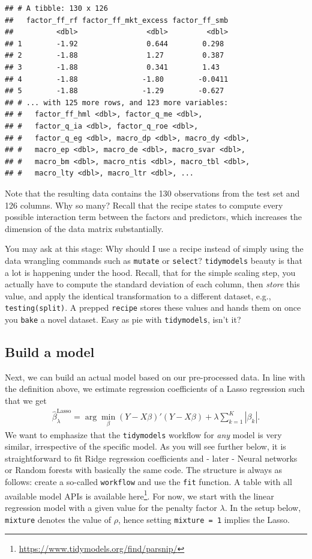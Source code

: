 \documentclass[
]{krantz}
\renewcommand{\href}[2]{#2\footnote{\url{#1}}}
\begin{document}
\begin{verbatim}
## # A tibble: 130 x 126
##   factor_ff_rf factor_ff_mkt_excess factor_ff_smb
##          <dbl>                <dbl>         <dbl>
## 1        -1.92                0.644        0.298 
## 2        -1.88                1.27         0.387 
## 3        -1.88                0.341        1.43  
## 4        -1.88               -1.80        -0.0411
## 5        -1.88               -1.29        -0.627 
## # ... with 125 more rows, and 123 more variables:
## #   factor_ff_hml <dbl>, factor_q_me <dbl>,
## #   factor_q_ia <dbl>, factor_q_roe <dbl>,
## #   factor_q_eg <dbl>, macro_dp <dbl>, macro_dy <dbl>,
## #   macro_ep <dbl>, macro_de <dbl>, macro_svar <dbl>,
## #   macro_bm <dbl>, macro_ntis <dbl>, macro_tbl <dbl>,
## #   macro_lty <dbl>, macro_ltr <dbl>, ...
\end{verbatim}

Note that the resulting data contains the 130 observations from the test set and 126 columns. Why so many? Recall that the recipe states to compute every possible interaction term between the factors and predictors, which increases the dimension of the data matrix substantially.

You may ask at this stage: Why should I use a recipe instead of simply using the data wrangling commands such as \texttt{mutate} or \texttt{select}? \texttt{tidymodels} beauty is that a lot is happening under the hood. Recall, that for the simple scaling step, you actually have to compute the standard deviation of each column, then \emph{store} this value, and apply the identical transformation to a different dataset, e.g., \texttt{testing(split)}. A prepped \texttt{recipe} stores these values and hands them on once you \texttt{bake} a novel dataset. Easy as pie with \texttt{tidymodels}, isn't it?

\hypertarget{build-a-model}{%
\subsection{Build a model}\label{build-a-model}}

Next, we can build an actual model based on our pre-processed data. In line with the definition above, we estimate regression coefficients of a Lasso regression such that we get
\[\begin{aligned}\hat\beta_\lambda^\text{Lasso} = \arg\min_\beta \left(Y - X\beta\right)'\left(Y - X\beta\right) + \lambda\sum\limits_{k=1}^K|\beta_k|.\end{aligned}\] We want to emphasize that the \texttt{tidymodels} workflow for \emph{any} model is very similar, irrespective of the specific model. As you will see further below, it is straightforward to fit Ridge regression coefficients and - later - Neural networks or Random forests with basically the same code. The structure is always as follows: create a so-called \texttt{workflow} and use the \texttt{fit} function. A table with all available model APIs is available \href{https://www.tidymodels.org/find/parsnip/}{here}.
For now, we start with the linear regression model with a given value for the penalty factor \(\lambda\). In the setup below, \texttt{mixture} denotes the value of \(\rho\), hence setting \texttt{mixture\ =\ 1} implies the Lasso.
\end{document}
